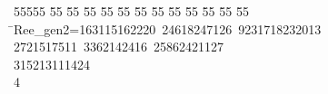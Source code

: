 %
%
\begin{tabbing}
55555 \= 55 \= 55 \= 55 \= 55 \= 55 \= 55 \= 55 \= 55 \= 55 \= 55 \= 55 \= 55 \= \>Ree\_gen2=163115162220\ 24618247126\ 9231718232013\ \\[0pt]
2721517511\ 3362142416\ 25862421127\ \\[0pt]
315213111424\\[0pt]
4\>\end{tabbing}
